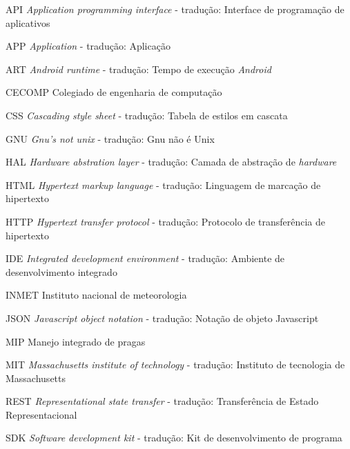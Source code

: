 \begin{KeepFromToc}
\listoffigures
\cleardoublepage


\listoftables
\cleardoublepage

\end{KeepFromToc}
\begin{siglas}
	\item[API]      \textit{Application programming interface} - tradução: Interface de programação de aplicativos
    \item[APP]		\textit{Application} - tradução: Aplicação
	\item[ART]      \textit{Android runtime} - tradução: Tempo de execução \textit{Android}
	\item[CECOMP]	Colegiado de engenharia de computação
	\item[CSS]      \textit{Cascading style sheet} - tradução: Tabela de estilos em cascata
    \item[GNU]		\textit{Gnu's not unix} - tradução: Gnu não é Unix
	\item[HAL]      \textit{Hardware abstration layer} - tradução: Camada de abstração de \textit{hardware} 
	\item[HTML]     \textit{Hypertext markup language} - tradução: Linguagem  de marcação de hipertexto
	\item[HTTP]     \textit{Hypertext transfer protocol} - tradução: Protocolo de transferência de hipertexto
	\item[IDE]      \textit{Integrated development environment} - tradução: Ambiente de desenvolvimento integrado
	\item[INMET]	Instituto nacional de meteorologia
    \item[JSON]	    \textit{Javascript object notation} - tradução: Notação de objeto Javascript
	\item[MIP]      Manejo integrado de pragas
    \item[MIT]		\textit{Massachusetts institute of technology} - tradução: Instituto de tecnologia de Massachusetts
	\item[REST]     \textit{Representational state transfer} - tradução: Transferência de Estado Representacional
	\item[SDK]		\textit{Software development kit} - tradução: Kit de desenvolvimento de programa

\end{siglas}
